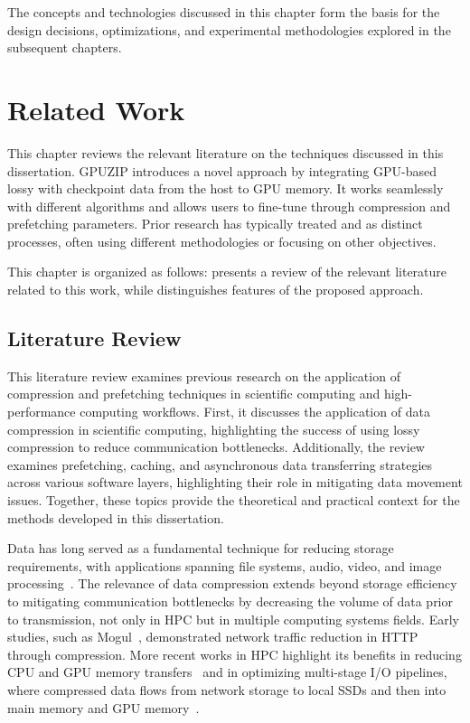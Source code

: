 \documentclass[Ingles,Final]{ic-tese-v3}
\begin{document}
The concepts and technologies discussed in this chapter form the basis for the design decisions, optimizations, and experimental methodologies explored in the subsequent chapters.


\chapter{ Related Work }
\label{ch:related_work}

This chapter reviews the relevant literature on the techniques discussed in this dissertation. GPUZIP introduces a novel approach by integrating GPU-based lossy \compression with \prefetching checkpoint data from the host to GPU memory. It works seamlessly with different \checkpointing algorithms and allows users to fine-tune through compression and prefetching parameters. Prior research has typically treated \compression and \prefetching as distinct processes, often using different methodologies or focusing on other objectives.

This chapter is organized as follows:  presents a review of the relevant literature related to this work, while  distinguishes features of the proposed approach.

\section{Literature Review}
\label{sec:review}

This literature review examines previous research on the application of compression and prefetching techniques in scientific computing and high-performance computing workflows. First, it discusses the application of data compression in scientific computing, highlighting the success of using lossy compression to reduce communication bottlenecks. Additionally, the review examines prefetching, caching, and asynchronous data transferring strategies across various software layers, highlighting their role in mitigating data movement issues. Together, these topics provide the theoretical and practical context for the methods developed in this dissertation.

Data \compression has long served as a fundamental technique for reducing storage requirements, with applications spanning file systems, audio, video, and image processing~\cite{fz}. The relevance of data compression extends beyond storage efficiency to mitigating communication bottlenecks by decreasing the volume of data prior to transmission, not only in HPC but in multiple computing systems fields. Early studies, such as Mogul~\etal\cite{mogul1997}, demonstrated network traffic reduction in HTTP through compression. More recent works in HPC highlight its benefits in reducing CPU and GPU memory transfers~\cite{shen2022,shen2023} and in optimizing multi-stage I/O pipelines, where compressed data flows from network storage to local SSDs and then into main memory and GPU memory~\cite{maurya2023}.
\end{document}
